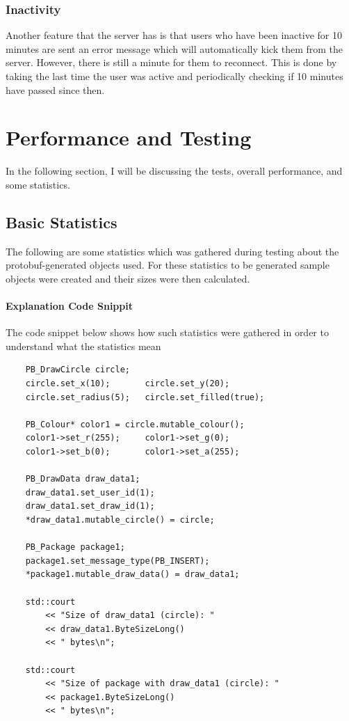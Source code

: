 \documentclass[12pt, a4paper]{report}
\begin{document}
\subsection{Inactivity}
Another feature that the server has is that users who have been inactive for 10 minutes are sent an error message which will automatically kick them from the server. However, there is still a minute for them to reconnect. This is done by taking the last time the user was active and periodically checking if 10 minutes have passed since then.


\chapter{Performance and Testing}
In the following section, I will be discussing the tests, overall performance, and some statistics.

\section{Basic Statistics}
The following are some statistics which was gathered during testing about the protobuf-generated objects used. For these statistics to be generated sample objects were created and their sizes were then calculated.


\subsubsection{Explanation Code Snippit}
The code snippet below shows how such statistics were gathered in order to understand what the statistics mean

\begin{verbatim}
    PB_DrawCircle circle;
    circle.set_x(10);       circle.set_y(20);
    circle.set_radius(5);   circle.set_filled(true);
    
    PB_Colour* color1 = circle.mutable_colour();
    color1->set_r(255);     color1->set_g(0);
    color1->set_b(0);       color1->set_a(255);

    PB_DrawData draw_data1;
    draw_data1.set_user_id(1);
    draw_data1.set_draw_id(1);
    *draw_data1.mutable_circle() = circle;

    PB_Package package1;
    package1.set_message_type(PB_INSERT);
    *package1.mutable_draw_data() = draw_data1;
    
    std::court 
        << "Size of draw_data1 (circle): " 
        << draw_data1.ByteSizeLong() 
        << " bytes\n";

    std::court 
        << "Size of package with draw_data1 (circle): " 
        << package1.ByteSizeLong() 
        << " bytes\n";
\end{verbatim}
\end{document}
